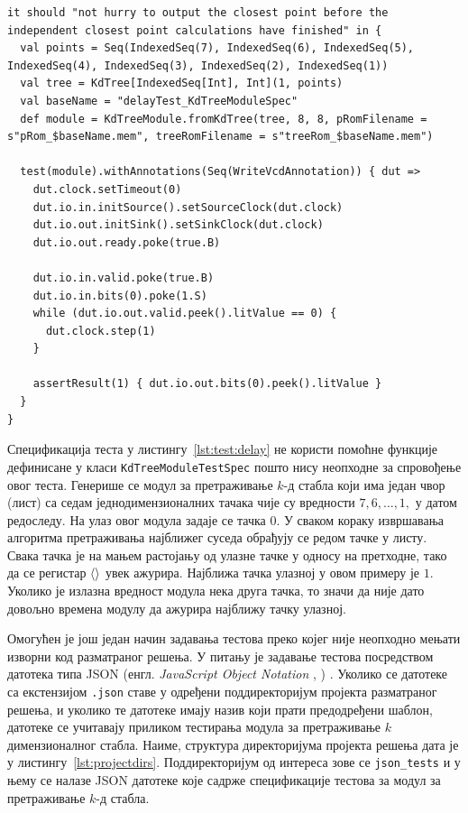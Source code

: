 \documentclass[master]{finthesis}
\makeatletter
\newcommand*{\engl}[2][\@empty]{%
    \edef\theacronym{#1}%
    (енгл. \foreignlanguage{english}{\emph{#2}%
    \ifx\theacronym\@empty \else , #1\fi})%
}
\newcommand*{\kdim}[1]{\texorpdfstring{$k$\Hyphdash}{k-}димензионал#1}
\newcommand*{\kd}{\texorpdfstring{$k$}{k}-д }
\newcommand*{\correctmath}[1]{%
    \ifcsname mathCorrectionFor#1\endcsname%
        \csname mathCorrectionFor#1\endcsname%
    \else%
        #1%
    \fi%
}
\newcommand*{\mfield}[1]{{\langle\correctmath{#1}\/\rangle}}
\newcommand*{\field}[1]{\texorpdfstring{$\mfield{#1}$}{⟨#1⟩}}
\newcommand*{\prog}[1]{\texttt{#1}}
\makeatother
\begin{document}
\begin{lstlisting}[style=Chisel, caption={Реализација теста који проверава исправно ажурирање најближе тачке при крају рада модула.}, label={lst:test:delay}]
it should "not hurry to output the closest point before the independent closest point calculations have finished" in {
  val points = Seq(IndexedSeq(7), IndexedSeq(6), IndexedSeq(5), IndexedSeq(4), IndexedSeq(3), IndexedSeq(2), IndexedSeq(1))
  val tree = KdTree[IndexedSeq[Int], Int](1, points)
  val baseName = "delayTest_KdTreeModuleSpec"
  def module = KdTreeModule.fromKdTree(tree, 8, 8, pRomFilename = s"pRom_$baseName.mem", treeRomFilename = s"treeRom_$baseName.mem")

  test(module).withAnnotations(Seq(WriteVcdAnnotation)) { dut =>
    dut.clock.setTimeout(0)
    dut.io.in.initSource().setSourceClock(dut.clock)
    dut.io.out.initSink().setSinkClock(dut.clock)
    dut.io.out.ready.poke(true.B)

    dut.io.in.valid.poke(true.B)
    dut.io.in.bits(0).poke(1.S)
    while (dut.io.out.valid.peek().litValue == 0) {
      dut.clock.step(1)
    }

    assertResult(1) { dut.io.out.bits(0).peek().litValue }
  }
}
\end{lstlisting}

Спецификација теста у листингу~\ref{lst:test:delay} не користи помоћне функције дефинисане у класи \prog{KdTreeModuleTestSpec} пошто нису неопходне за спровођење овог теста. Генерише се модул за претраживање \kd стабла који има један чвор (лист) са седам једнодимензионалних тачака чије су вредности $7, 6, \dots, 1,$ у датом редоследу. На улаз овог модула задаје се тачка $0$. У сваком кораку извршавања алгоритма претраживања најближег суседа обрађују се редом тачке у листу. Свака тачка је на мањем растојању од улазне тачке у односу на претходне, тако да се регистар \field{closestPoint} увек ажурира. Најближа тачка улазној у овом примеру је $1$. Уколико је излазна вредност модула нека друга тачка, то значи да није дато довољно времена модулу да ажурира најближу тачку улазној.

Омогућен је још један начин задавања тестова преко којег није неопходно мењати изворни код разматраног решења. У питању је задавање тестова посредством датотека типа JSON \engl{JavaScript Object Notation}. Уколико се датотеке са екстензијом \texttt{.json} ставе у одређени поддиректоријум пројекта разматраног решења, и уколико те датотеке имају назив који прати предодређени шаблон, датотеке се учитавају приликом тестирања модула за претраживање \kdim{ног} стабла. Наиме, структура директоријума пројекта решења дата је у листингу~\ref{lst:projectdirs}. Поддиректоријум од интереса зове се \texttt{json\_tests} и у њему се налазе JSON датотеке које садрже спецификације тестова за модул за претраживање \kd стабла.
\end{document}
